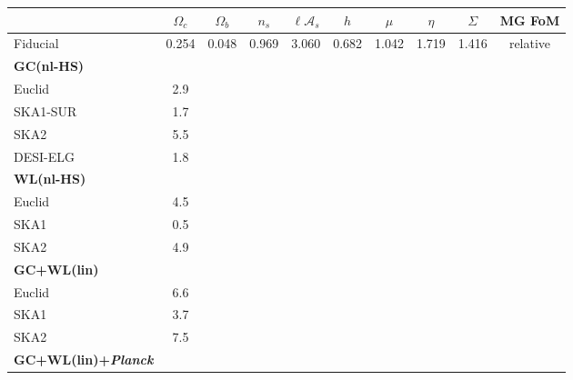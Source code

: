 \begin{table}[htbp]
\centering{}%
\tiny
\begin{tabular}{|l|c|c|c|c|c||c|c|c|c|}
	\hline
	 & $\Omega_{c}$ & $\Omega_{b}$ & $n_{s}$ & $\ell\mathcal{A}_{s}$ & $h$ & $\mu$ & $\eta$ & $\Sigma$ & MG FoM \TBstrut\tabularnewline
\hline 
Fiducial & {0.254 } & {0.048 } & {0.969 } & {3.060 } & {0.682 } & {1.042 } & {1.719 } & {1.416 } & relative\TBstrut\tabularnewline
\hline 
\hline 
\textbf{GC(nl-HS)} &  &  &  &  &  &  &  & & \TBstrut\tabularnewline
Euclid   

& 2.9
\tabularnewline
SKA1-SUR  

& 1.7
\tabularnewline
SKA2  

& 5.5
\tabularnewline
DESI-ELG   

& 1.8
\tabularnewline
\hline 
\hline 
\textbf{WL(nl-HS)} &  &  &  &  &  &  &  &  & \TBstrut\tabularnewline
Euclid   

& 4.5
\tabularnewline
SKA1  

& 0.5
\tabularnewline
SKA2  

& 4.9
\tabularnewline
\hline 
\hline 
\textbf{GC+WL(lin)} &  &  &  &  &  &  &  & & \Tstrut\tabularnewline
Euclid  

& 6.6
\tabularnewline
SKA1  

& 3.7
\tabularnewline
SKA2 

& 7.5
\tabularnewline
\hline 
\hline 
\textbf{GC+WL(lin)+{\it Planck}} &  &  &  &  &  &  &  & & \Tstrut\tabularnewline

\end{tabular}
\end{table}
